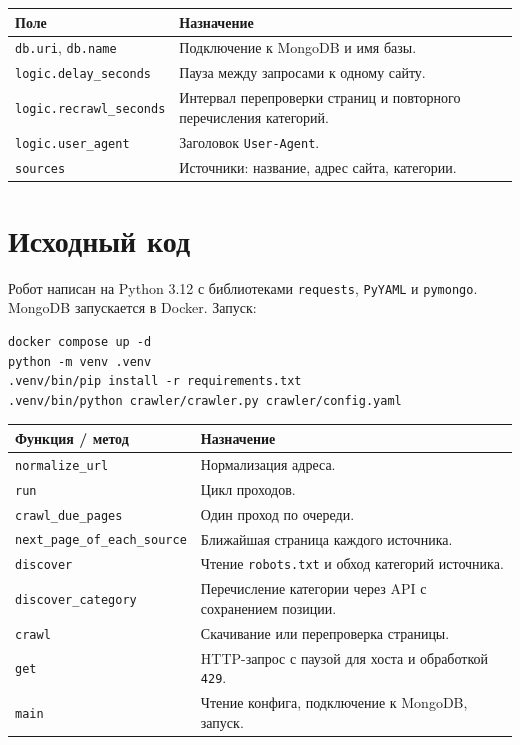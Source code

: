 \documentclass[12pt,a4paper,oneside,fleqn]{article}
\begin{document}
\begin{longtable}{|p{4.2cm}|p{10.8cm}|}
\hline
\textbf{Поле} & \textbf{Назначение} \\
\hline
\texttt{db.uri}, \texttt{db.name} & Подключение к MongoDB и имя базы. \\
\hline
\texttt{logic.delay\_seconds} & Пауза между запросами к одному сайту. \\
\hline
\texttt{logic.recrawl\_seconds} & Интервал перепроверки страниц и повторного перечисления категорий. \\
\hline
\texttt{logic.user\_agent} & Заголовок \texttt{User-Agent}. \\
\hline
\texttt{sources} & Источники: название, адрес сайта, категории. \\
\hline
\end{longtable}

\pagebreak

\section{Исходный код}

Робот написан на Python 3.12 с библиотеками \texttt{requests}, \texttt{PyYAML} и \texttt{pymongo}. MongoDB запускается в Docker. Запуск:

\begin{lstlisting}[style=plaintext]
docker compose up -d
python -m venv .venv
.venv/bin/pip install -r requirements.txt
.venv/bin/python crawler/crawler.py crawler/config.yaml
\end{lstlisting}

\begin{longtable}{|p{4.8cm}|p{10.2cm}|}
\hline
\textbf{Функция / метод} & \textbf{Назначение} \\
\hline
\texttt{normalize\_url} & Нормализация адреса. \\
\hline
\texttt{run} & Цикл проходов. \\
\hline
\texttt{crawl\_due\_pages} & Один проход по очереди. \\
\hline
\texttt{next\_page\_of\_each\_source} & Ближайшая страница каждого источника. \\
\hline
\texttt{discover} & Чтение \texttt{robots.txt} и обход категорий источника. \\
\hline
\texttt{discover\_category} & Перечисление категории через API с сохранением позиции. \\
\hline
\texttt{crawl} & Скачивание или перепроверка страницы. \\
\hline
\texttt{get} & HTTP-запрос с паузой для хоста и обработкой \texttt{429}. \\
\hline
\texttt{main} & Чтение конфига, подключение к MongoDB, запуск. \\
\hline
\end{longtable}
\end{document}
